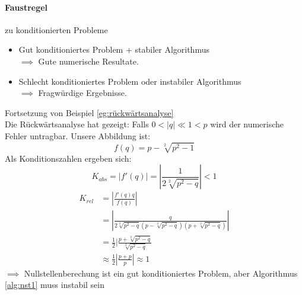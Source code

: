 \paragraph{Faustregel}zu konditionierten Probleme
\begin{itemize}
	\item Gut konditioniertes Problem + stabiler Algorithmus \\ $\implies$ Gute numerische Resultate.
\item Schlecht konditioniertes Problem oder instabiler Algorithmus \\ $\implies$ Fragwürdige Ergebnisse.
\end{itemize}

\begin{example}
Fortsetzung von Beispiel \ref{eg:rückwärtsanalyse} \\
Die Rückwärtsanalyse hat gezeigt: Falls $0<|q| \ll 1 <p$ wird der numerische Fehler untragbar.
Unsere Abbildung ist:
\[
f(q)=p-\sqrt[2]{p^2-1}
\]
Als Konditionszahlen ergeben sich:
\begin{equation*}
K_{abs} = |f'(q)|= |\frac{1}{2\sqrt[2]{p^2-q}}| < 1
\end{equation*}
\begin{align*}
	K_{rel} 
	&=|\frac{f'(q)q}{f(q)}| \\
	&=|\frac{q}{2\sqrt[2]{p^2-q}(p-\sqrt[2]{p^2-q})(p+\sqrt[2]{p^2-q})}| \\
	&=\frac{1}{2}|\frac{p+\sqrt[2]{p^2-q}}{\sqrt[2]{p^2-q}} \\
	&\approx \frac{1}{2}|\frac{p+p}{p}| \approx 1
\end{align*}%
$\implies$ Nullstellenberechung ist ein gut konditioniertes Problem, aber  Algorithmus \ref{alg:nst1} muss instabil sein
\end{example}

